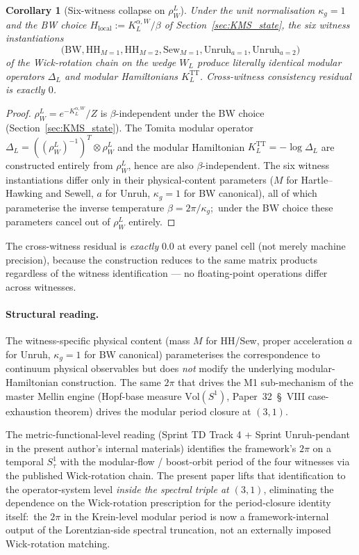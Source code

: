 \documentclass[11pt,a4paper]{article}
\theoremstyle{plain}
\newtheorem{corollary}[theorem]{Corollary}
\theoremstyle{definition}
\newcommand{\Vol}{\mathrm{Vol}}
\newcommand{\KL}{K_{L}}
\newcommand{\TT}{\mathrm{TT}}
\newcommand{\BW}{\mathrm{BW}}
\newcommand{\HH}{\mathrm{HH}}
\newcommand{\Sew}{\mathrm{Sew}}
\newcommand{\Unruh}{\mathrm{Unruh}}
\begin{document}
\begin{corollary}[Six-witness collapse on $\rho_W^L$]\label{cor:six_witness}
Under the unit normalisation $\kappa_g = 1$ and the BW choice
$H_{\mathrm{local}} := \KL^{\alpha, W} / \beta$ of
Section~\ref{sec:KMS_state}, the six witness instantiations
\[
   \bigl(\BW, \HH_{M=1}, \HH_{M=2}, \Sew_{M=1}, \Unruh_{a=1},
   \Unruh_{a=2}\bigr)
\]
of the Wick-rotation chain on the wedge $W_L$ produce literally
identical modular operators $\Delta_L$ and modular Hamiltonians
$\KL^\TT$. Cross-witness consistency residual is exactly $0$.
\end{corollary}

\begin{proof}
$\rho_W^L = e^{-\KL^{\alpha, W}}/Z$ is $\beta$-independent under the
BW choice (Section~\ref{sec:KMS_state}). The Tomita modular operator
$\Delta_L = ((\rho_W^L)^{-1})^T \otimes \rho_W^L$ and the modular
Hamiltonian $\KL^\TT = -\log \Delta_L$ are constructed entirely from
$\rho_W^L$, hence are also $\beta$-independent. The six witness
instantiations differ only in their physical-content parameters
($M$ for Hartle--Hawking and Sewell, $a$ for Unruh, $\kappa_g = 1$ for
BW canonical), all of which parameterise the inverse temperature
$\beta = 2\pi/\kappa_g$;\ under the BW choice these parameters
cancel out of $\rho_W^L$ entirely.
\end{proof}

The cross-witness residual is \emph{exactly} $0.0$ at every panel cell
(not merely machine precision), because the construction reduces to
the same matrix products regardless of the witness identification — no
floating-point operations differ across witnesses.

\paragraph{Structural reading.}
The witness-specific physical content (mass $M$ for HH/Sew, proper
acceleration $a$ for Unruh, $\kappa_g = 1$ for BW canonical)
parameterises the correspondence to continuum physical observables but
does \emph{not} modify the underlying modular-Hamiltonian construction.
The same $2\pi$ that drives the M1 sub-mechanism of the master Mellin
engine (Hopf-base measure $\Vol(S^1)$, Paper~32~\S~VIII case-exhaustion
theorem) drives the modular period closure at $(3, 1)$.

The metric-functional-level reading (Sprint TD Track 4 + Sprint
Unruh-pendant in the present author's internal materials)
identifies the framework's $2\pi$ on a temporal $S^1_\tau$ with the
modular-flow / boost-orbit period of the four witnesses via the
published Wick-rotation chain. The present paper lifts that
identification to the operator-system level \emph{inside the spectral
triple at $(3, 1)$}, eliminating the dependence on the Wick-rotation
prescription for the period-closure identity itself:\ the $2\pi$ in
the Krein-level modular period is now a framework-internal output of
the Lorentzian-side spectral truncation, not an externally imposed
Wick-rotation matching.
\end{document}
